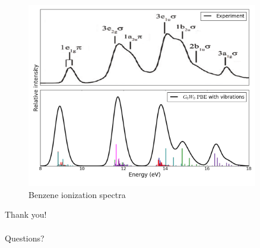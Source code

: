 \documentclass[12pt, fleqn]{beamer}
\begin{document}
\begin{frame}
    \begin{figure}
        \caption*{Benzene ionization spectra}
        \includegraphics[width=0.9\textwidth]{all_peaks_thick.png}
    \end{figure}
\end{frame}

\begin{frame}
    \centering
    \begin{Large}
        Thank you! \\ ~\\
        Questions?
    \end{Large}
\end{frame}
\end{document}

